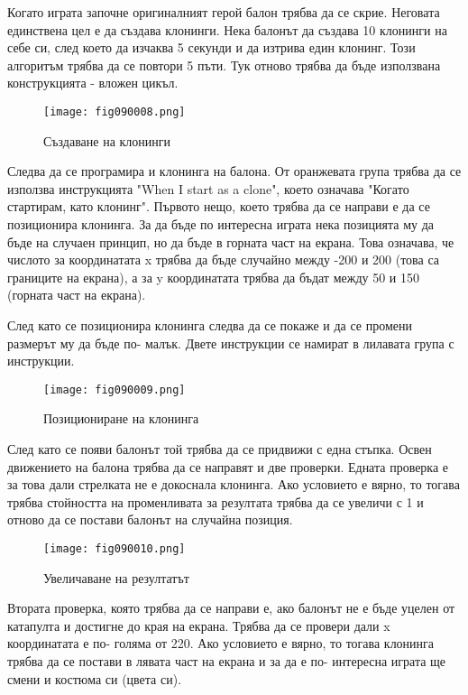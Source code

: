 Когато играта започне оригиналният герой балон трябва да се скрие. Неговата единствена цел е да създава клонинги. Нека балонът да създава 10 клонинги на себе си, след което да изчаква 5 секунди и да изтрива един клонинг. Този алгоритъм трябва да се повтори 5 пъти. Тук отново трябва да бъде използвана конструкцията - вложен цикъл.

\begin{figure}[H]
  \centering
  \texttt{[image: fig090008.png]}
  \caption{Създаване на клонинги}
\label{fig090008}
\end{figure}

Следва да се програмира и клонинга на балона. От оранжевата група трябва да се използва инструкцията "When I start as a clone", което означава "Когато стартирам, като клонинг". Първото нещо, което трябва да се направи е да се позиционира клонинга. За да бъде по интересна играта нека позицията му да бъде на случаен принцип, но да бъде в горната част на екрана. Това означава, че числото за координатата x трябва да бъде случайно между -200 и 200 (това са границите на екрана), а за y координатата трябва да бъдат между 50 и 150 (горната част на екрана).

След като се позиционира клонинга следва да се покаже и да се промени размерът му да бъде по- малък. Двете инструкции се намират в лилавата група с инструкции.

\begin{figure}[H]
  \centering
  \texttt{[image: fig090009.png]}
  \caption{Позициониране на клонинга}
\label{fig090009}
\end{figure}

След като се появи балонът той трябва да се придвижи с една стъпка. Освен движението на балона трябва да се направят и две проверки. Едната проверка е за това дали стрелката не е докоснала клонинга. Ако условието е вярно, то тогава трябва стойността на променливата за резултата трябва да се увеличи с 1 и отново да се постави балонът на случайна позиция.

\begin{figure}[H]
  \centering
  \texttt{[image: fig090010.png]}
  \caption{Увеличаване на резултатът}
\label{fig090010}
\end{figure}

Втората проверка, която трябва да се направи е, ако балонът не е бъде уцелен от катапулта и достигне до края на екрана. Трябва да се провери дали x координатата е по- голяма от 220. Ако условието е вярно, то тогава клонинга трябва да се постави в лявата част на екрана и за да е по- интересна играта ще смени и костюма си (цвета си).

